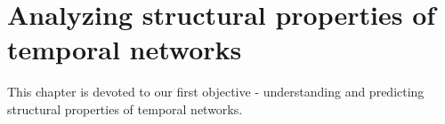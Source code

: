 
\chapter{Analyzing structural properties of temporal networks}
This chapter is devoted to our first objective - understanding and predicting structural properties of temporal networks.



%






 



 







% 


%



%


